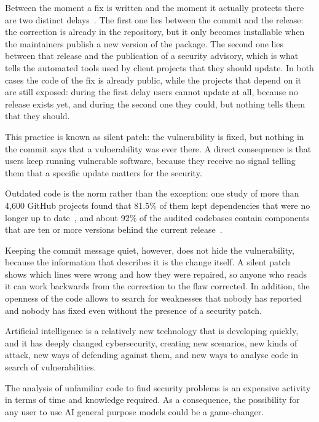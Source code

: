     Between the moment a fix is written and the moment it actually protects there are two
    distinct delays~\cite{imtiaz2023opensneaky}.
    The first one lies between the commit and the release: the correction is already in the
    repository, but it only becomes installable when the maintainers publish a new version of the
    package.
    The second one lies between that release and the publication of a security advisory, which is
    what tells the automated tools used by client projects that they should update.
    In both cases the code of the fix is already public, while the projects that depend on it are
    still exposed: during the first delay users cannot update at all, because no release exists yet,
    and during the second one they could, but nothing tells them that they should.

    This practice is known as silent patch: the vulnerability is fixed, but nothing in the commit
    says that a vulnerability was ever there.
    A direct consequence is that users keep running vulnerable software, because they receive no
    signal telling them that a specific update matters for the security.

    Outdated code is the norm rather than the exception: one study of more than 4,600 GitHub
    projects found that 81.5\% of them kept dependencies that were no longer up to
    date~\cite{ayala2025disclosures}, and about 92\% of the audited codebases contain components
    that are ten or more versions behind the current release~\cite{ossra2026}.

    Keeping the commit message quiet, however, does not hide the vulnerability, because the
    information that describes it is the change itself.
    A silent patch shows which lines were wrong and how they were repaired, so anyone who reads it
    can work backwards from the correction to the flaw corrected.
    In addition, the openness of the code allows to search for weaknesses that nobody has reported and nobody has fixed 
    even without the presence of a security patch.

    Artificial intelligence is a relatively new technology that is developing quickly, and it has
    deeply changed cybersecurity, creating new scenarios, new kinds of attack, new ways of
    defending against them, and new ways to analyse code in search of vulnerabilities.

    
    The analysis of unfamiliar code to find security problems is an expensive activity
    in terms of time and knowledge required. As a consequence, the possibility for any user to use AI general purpose
    models could be a game-changer.

